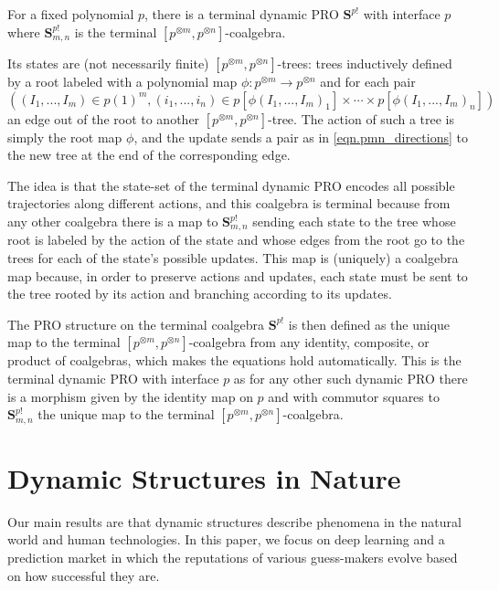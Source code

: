\documentclass[11pt, one side, article]{memoir}
\theoremstyle{definition}
\theoremstyle{plain}
\newenvironment{example}
  {\pushQED{\qed}\renewcommand{\qedsymbol}{$\lozenge$}\examplex}
  {\popQED\endexamplex}
\newcommand{\Cat}[1]{\mathbf{#1}}%
\newcommand{\0}{\textsf{0}}
\newcommand{\1}{\tn{\textsf{1}}}
\renewcommand{\S}{{\Cat{S}}}
\begin{document}
\begin{example}
For a fixed polynomial $p$, there is a terminal dynamic PRO $\S^{p!}$ with interface $p$ where $\S^{p!}_{m,n}$ is the terminal $[p^{\otimes m},p^{\otimes n}]$-coalgebra. 

Its states are (not necessarily finite) $[p^{\otimes m},p^{\otimes n}]$-trees: trees inductively defined by a root labeled with a polynomial map $\phi\colon p^{\otimes m} \to p^{\otimes n}$ and for each pair 
\begin{equation}\label{eqn.pmn_directions}
\left((I_1,...,I_m) \in p(1)^m, (i_1,...,i_n) \in p[\phi(I_1,...,I_m)_1] \times \cdots \times p[\phi(I_1,...,I_m)_n]\right)
\end{equation}
an edge out of the root to another $[p^{\otimes m},p^{\otimes n}]$-tree. The action of such a tree is simply the root map $\phi$, and the update sends a pair as in \eqref{eqn.pmn_directions} to the new tree at the end of the corresponding edge. 

The idea is that the state-set of the terminal dynamic PRO encodes all possible trajectories along different actions, and this coalgebra is terminal because from any other coalgebra there is a map to $\S^{p!}_{m,n}$ sending each state to the tree whose root is labeled by the action of the state and whose edges from the root go to the trees for each of the state's possible updates. This map is (uniquely) a coalgebra map because, in order to preserve actions and updates, each state must be sent to the tree rooted by its action and branching according to its updates.

The PRO structure on the terminal coalgebra $\S^{p!}$ is then defined as the unique map to the terminal $[p^{\otimes m},p^{\otimes n}]$-coalgebra from any identity, composite, or product of coalgebras, which makes the equations hold automatically. This is the terminal dynamic PRO with interface $p$ as for any other such dynamic PRO there is a morphism given by the identity map on $p$ and with commutor squares to $\S^{p!}_{m,n}$ the unique map to the terminal $[p^{\otimes m},p^{\otimes n}]$-coalgebra.
\end{example}



\chapter{Dynamic Structures in Nature}
%

Our main results are that dynamic structures describe phenomena in the natural world and human technologies. In this paper, we focus on deep learning and a prediction market in which the reputations of various guess-makers evolve based on how successful they are.
\end{document}
